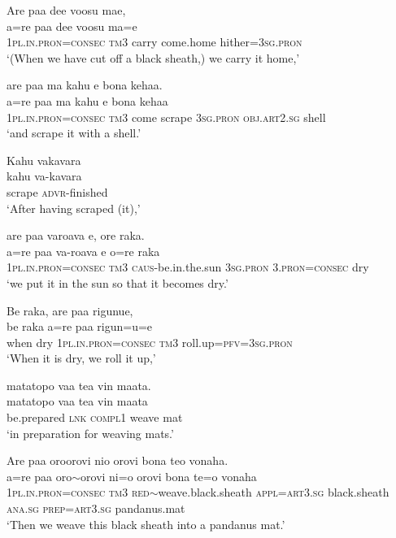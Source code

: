 \ea\label{ex:text7-53}
Are paa dee voosu mae,\\
\gll a=re	paa	dee	voosu	ma=e\\
     1\textsc{pl}.\textsc{in}.\textsc{pron}=\textsc{consec}	\textsc{tm}3	carry	come.home	hither=3\textsc{sg}.\textsc{pron}\\
\glt `(When we have cut off a black sheath,) we carry it home,'
\z

\ea\label{ex:text7-54}
are paa ma kahu e bona kehaa.\\
\gll a=re	paa	ma	kahu	e	bona	kehaa\\
     1\textsc{pl}.\textsc{in}.\textsc{pron}=\textsc{consec}	\textsc{tm}3	come	scrape	3\textsc{sg}.\textsc{pron}	\textsc{obj}.\textsc{art}2.\textsc{sg}	shell\\
\glt `and scrape it with a shell.'
\z

\ea\label{ex:text7-55}
Kahu vakavara\\
\gll kahu	va-kavara\\
     scrape	\textsc{advr}-finished\\
\glt `After having scraped (it),'
\z

\ea\label{ex:text7-56}
are paa varoava e, ore raka.\\
\gll a=re	paa	va-roava	e	o=re	raka\\
     1\textsc{pl}.\textsc{in}.\textsc{pron}=\textsc{consec}	\textsc{tm}3	\textsc{caus}-be.in.the.sun	3\textsc{sg}.\textsc{pron}	3.\textsc{pron}=\textsc{consec}	dry\\
\glt `we put it in the sun so that it becomes dry.'
\z

\ea\label{ex:text7-57}
Be raka, are paa rigunue,\\
\gll be	raka	a=re	paa	rigun=u=e\\
     when	dry	1\textsc{pl}.\textsc{in}.\textsc{pron}=\textsc{consec}	\textsc{tm}3	roll.up=\textsc{pfv}=3\textsc{sg}.\textsc{pron}\\
\glt `When it is dry, we roll it up,'
\z

\ea\label{ex:text7-58}
matatopo vaa tea vin maata.\\
\gll matatopo	vaa	tea	vin	maata\\
     be.prepared	\textsc{lnk}	\textsc{compl}1	weave	mat\\
\glt `in preparation for weaving mats.'
\z

\ea\label{ex:text7-59}
Are paa oroorovi nio orovi bona teo vonaha.\\
\gll a=re	paa	oro{$\sim$}orovi	ni=o	orovi	bona	te=o	vonaha\\
     1\textsc{pl}.\textsc{in}.\textsc{pron}=\textsc{consec}	\textsc{tm}3	\textsc{red}{$\sim$}weave.black.sheath	\textsc{appl}=\textsc{art}3.\textsc{sg}	black.sheath	\textsc{ana}.\textsc{sg}	\textsc{prep}=\textsc{art}3.\textsc{sg}	pandanus.mat\\
\glt `Then we weave this black sheath into a pandanus mat.'
\z

